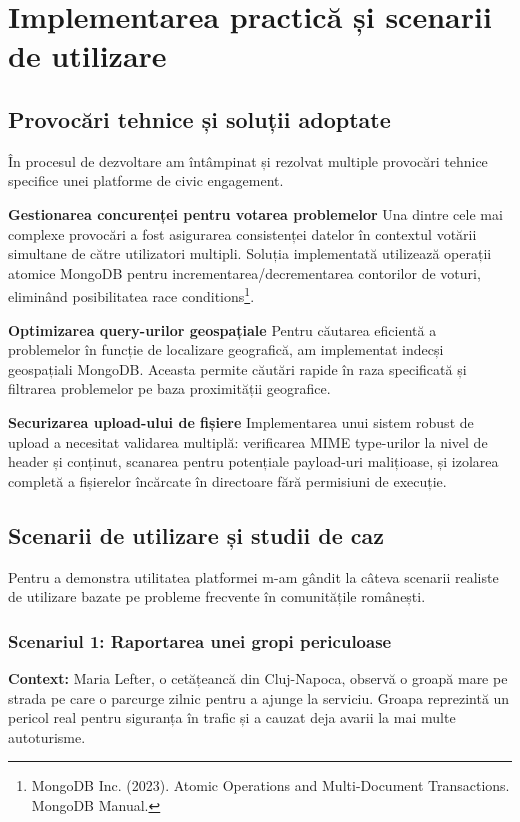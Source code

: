 \documentclass[12pt,a4paper]{report}
\begin{document}
\newpage
\chapter{Implementarea practică și scenarii de utilizare}


\section{Provocări tehnice și soluții adoptate}

În procesul de dezvoltare am întâmpinat și rezolvat multiple provocări tehnice specifice unei platforme de civic engagement.

\textbf{Gestionarea concurenței pentru votarea problemelor}
Una dintre cele mai complexe provocări a fost asigurarea consistenței datelor în contextul votării simultane de către utilizatori multipli. Soluția implementată utilizează operații atomice MongoDB pentru incrementarea/decrementarea contorilor de voturi, eliminând posibilitatea race conditions\footnote{MongoDB Inc. (2023). Atomic Operations and Multi-Document Transactions. MongoDB Manual.}.

\textbf{Optimizarea query-urilor geospațiale}
Pentru căutarea eficientă a problemelor în funcție de localizare geografică, am implementat indecși geospațiali MongoDB. Aceasta permite căutări rapide în raza specificată și filtrarea problemelor pe baza proximității geografice.

\textbf{Securizarea upload-ului de fișiere}
Implementarea unui sistem robust de upload a necesitat validarea multiplă: verificarea MIME type-urilor la nivel de header și conținut, scanarea pentru potențiale payload-uri malițioase, și izolarea completă a fișierelor încărcate în directoare fără permisiuni de execuție.

\section{Scenarii de utilizare și studii de caz}

Pentru a demonstra  utilitatea platformei m-am gândit la câteva scenarii realiste de utilizare bazate pe probleme frecvente în comunitățile românești.

\subsection{Scenariul 1: Raportarea unei gropi periculoase}

\textbf{Context:} Maria Lefter, o cetățeancă din Cluj-Napoca, observă o groapă mare pe strada pe care o parcurge zilnic pentru a ajunge la serviciu. Groapa reprezintă un pericol real pentru siguranța în trafic și a cauzat deja avarii la mai multe autoturisme.
\end{document}
